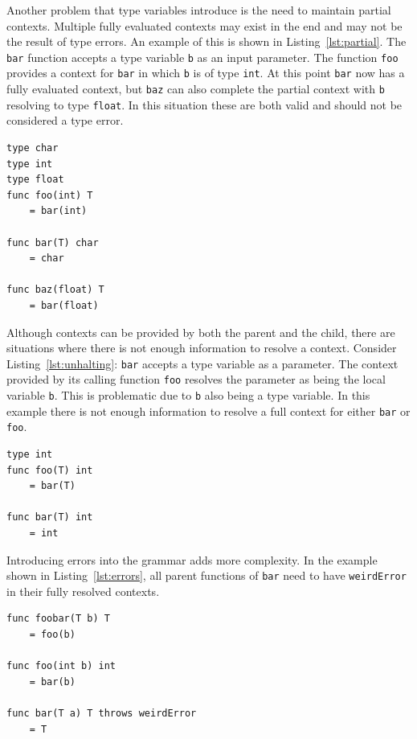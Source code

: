 \documentclass{acm_proc_article-sp}
\begin{document}
Another problem that type variables introduce is the need to maintain partial
contexts. Multiple fully evaluated contexts may exist in the end and may not be
the result of type errors. An example of this is shown in
Listing~\ref{lst:partial}. The \lstinline!bar! function accepts a type variable
\lstinline!b! as an input parameter. The function \lstinline!foo! provides a
context for \lstinline!bar! in which \lstinline!b! is of type \lstinline!int!.
At this point \lstinline!bar! now has a fully evaluated context, but
\lstinline!baz! can also complete the partial context with \lstinline!b!
resolving to type \lstinline!float!.  In this situation these are both valid
and should not be considered a type error.

\begin{lstlisting}[caption=Need to maintain partial contexts,language=Paratype,label=lst:partial]
type char
type int
type float
func foo(int) T
    = bar(int)

func bar(T) char
    = char

func baz(float) T
    = bar(float)
\end{lstlisting}

Although contexts can be provided by both the parent and the child, there are
situations where there is not enough information to resolve a context. Consider
Listing~\ref{lst:unhalting}: \lstinline!bar! accepts a type variable as a
parameter. The context provided by its calling function \lstinline!foo!
resolves the parameter as being the local variable \lstinline!b!. This is
problematic due to \lstinline!b! also being a type variable. In this example
there is not enough information to resolve a full context for either
\lstinline!bar! or \lstinline!foo!.

\begin{lstlisting}[caption=Unhalting context resolution,language=Paratype,label=lst:unhalting]
type int
func foo(T) int
    = bar(T)

func bar(T) int
    = int
\end{lstlisting}

Introducing errors into the grammar adds more complexity. In the example shown in Listing~\ref{lst:errors},
all parent functions of \lstinline!bar! need to have \lstinline!weirdError! in
their fully resolved contexts.

\begin{lstlisting}[caption=Errors,language=Paratype,label=lst:errors]
func foobar(T b) T
    = foo(b)

func foo(int b) int
    = bar(b)

func bar(T a) T throws weirdError
    = T
\end{lstlisting}
\end{document}

